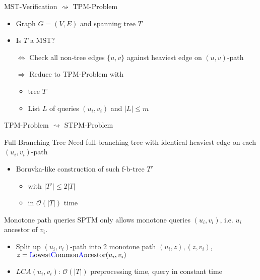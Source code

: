 \documentclass[18pt]{beamer}
\begin{document}
\begin{frame}{MST-Verification $	\rightsquigarrow$ TPM-Problem}
	\begin{itemize}
		\item Graph $G=(V,E)$ and spanning tree $T$
		\item Is $T$ a MST? 
		\item [$\Leftrightarrow$] Check all non-tree edges $\{u,v\}$ against heaviest edge on $(u,v)$-path
		
		\bigskip
		\pause
		\item [$\Rightarrow$] Reduce to TPM-Problem with 
		\begin{itemize}
			\item tree $T$
			\item List $L$ of queries $(u_i,v_i)$ and $|L| \le m$
		\end{itemize}
	\end{itemize}
\end{frame}
\begin{frame}{TPM-Problem $	\rightsquigarrow$ STPM-Problem}
	\begin{block}{Full-Branching Tree}
		Need {\color{blue} full-branching tree} with identical heaviest edge on each $(u_i,v_i)$-path
	\end{block}
	\begin{itemize}
		\item Boruvka-like construction of such f-b-tree $T'$
		\begin{itemize}
			\item with $|T'| \le 2|T|$
			\item in $\mathcal{O}(|T|)$ time
		\end{itemize}
	\end{itemize}
	\bigskip
	\pause
	\begin{block}{Monotone path queries}
		SPTM only allows monotone queries $(u_i,v_i)$, i.e. $u_i$ ancestor of $v_i$.
	\end{block}
	\begin{itemize}
	\item Split up $(u_i,v_i)$-path into 2 monotone path $(u_i,z), (z, v_i)$,  \\ $z = \textup{{\color{blue}L}owest{\color{blue}C}ommon{\color{blue}A}ncestor}(u_i,v_i)$
	\item $LCA(u_i,v_i)$: $\mathcal{O}(|T|)$ preprocessing time, query in constant time
	\end{itemize}
\end{frame}
\end{document}
